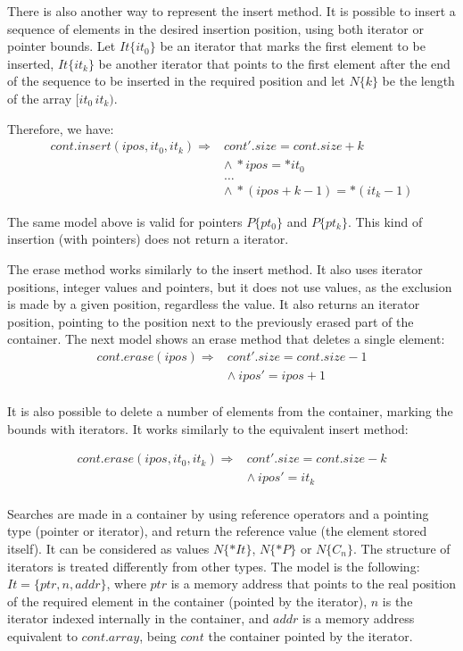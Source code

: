 \documentclass[a4paper]{llncs}
\begin{document}
There is also another way to represent the insert method.
It is possible to insert a sequence of elements in the desired
insertion position, using both iterator or pointer bounds.
Let $It\{it_0\}$ be an iterator that marks the first element
to be inserted, $It\{it_k\}$ be another iterator that
points to the first element after the end of the sequence to be inserted
in the required position and let $N\{k\}$ be the length of the array $[it_0\, it_k)$.

Therefore, we have:\\

\[\begin{array}{ll}
cont.insert(ipos, it_0, it_k) \Longrightarrow & cont'.size = cont.size + k\\
  & \wedge \: *ipos = *it_0 \\
  & \ldots \\
  & \wedge \: *(ipos + k - 1) = *(it_k - 1)
\end{array}\]

The same model above is valid for pointers $P\{pt_0\}$ and $P\{pt_k\}$.
This kind of insertion (with pointers) does not return a iterator.

The erase method works similarly to the insert method. It also uses iterator
positions, integer values and pointers, but it does not use values, as the exclusion
is made by a given position, regardless the value. It also returns an iterator position,
pointing to the position next to the previously erased part of the container.
The next model shows an erase method that deletes a single element:
%
\[\begin{array}{ll}
\label{erase1-model}
cont.erase (ipos) \Longrightarrow & cont'.size = cont.size - 1\\
  & \wedge \: ipos' = ipos + 1 \\
\end{array}\]

It is also possible to delete a number of elements from the container,
marking the bounds with iterators. It works similarly to the equivalent
insert method:

\[\begin{array}{ll}
\label{erase2-model}
cont.erase (ipos, it_0, it_k) \Longrightarrow & 	cont'.size = cont.size - k\\
  & \wedge \:	ipos' = it_k \\
\end{array}\]

Searches are made in a container by using reference operators
and a pointing type (pointer or iterator), and return the reference
value (the element stored itself). It can be considered as values
$N\{*It\}$, $N\{*P\}$ or $N\{C_n\}$.	The structure of iterators
is treated differently from other types. The model is the following:
$It = \{ ptr, n, addr\}$,
where $ptr$ is a memory address that points to the
real position of the required element in the container
(pointed by the iterator), $n$ is the iterator indexed
internally in the container, and $addr$ is a memory
address equivalent to $cont.array$, being $cont$ the container
pointed by the iterator.
\end{document}
